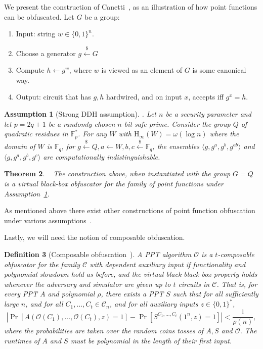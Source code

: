 \documentclass[11pt]{article}
\newcommand{\assref}[1]{\mbox{Assumption~\ref{#1}}}
\newcommand{\zo}{\ensuremath{\{0, 1\}}}
\newcommand{\Hoo}{\mathrm{H}_\infty}
\newtheorem{theorem}{Theorem}[section]
\newtheorem{definition}[theorem]{Definition}
\newtheorem{assumption}[theorem]{Assumption}
\begin{document}
We present the construction of Canetti~\cite{canetti1997towards}, as an illustration of how point functions can be obfuscated.  Let $G$ be a group:
\begin{enumerate}  
\item Input: string $w\in \zo^n$.
\item Choose a generator $g\overset{\$}\leftarrow G$
\item Compute $h\leftarrow g^w$, where $w$ is viewed as an element of $G$ is some canonical way.
\item Output: circuit that has $g, h$ hardwired, and on input $x$, accepts iff $g^x=h$.
\end{enumerate}
\begin{assumption}[Strong DDH assumption]\label{ass:strong ddh}.  Let $n$ be a security parameter and let $p = 2q+1$ be a randomly chosen $n$-bit safe prime.  Consider the group $Q$ of quadratic residues in $\mathbb{F}_p^*$.  For any $W$ with $\Hoo(W)= \omega(\log n)$ where the domain of $W$ is $\mathbb{F}_q$, for $g\overset{\$}\leftarrow Q, a\leftarrow W, b,c \overset{\$}\leftarrow \mathbb{F}_q$, the ensembles $\langle g, g^a, g^b, g^{ab}\rangle$ and $\langle g, g^a, g^b, g^c\rangle$ are computationally indistinguishable.
\end{assumption}
\begin{theorem}~\cite{canetti1997towards}
The construction above, when instantiated with the group $G = Q$ is a virtual black-box obfuscator for the family of point functions under \assref{ass:strong ddh}.
\end{theorem}

As mentioned above there exist other constructions of point function obfuscation under various assumptions~\cite{lynn2004positive, wee2005obfuscating}.

Lastly, we will need the notion of composable obfuscation.

\begin{definition}[Composable obfuscation~\cite{bitansky2010strong, canetti2008obfuscating,lynn2004positive}]
\label{def:obf comp}
A PPT algorithm $\mathcal{O}$ is a $t$-\emph{composable obfuscator} for the family $\mathcal{C}$ with dependent auxiliary input if functionality and polynomial slowdown hold as before, and the virtual black black-box property holds whenever the adversary and simulator are given up to $t$ circuits in $\mathcal{C}$.  That is, for every PPT $A$ and polynomial $\rho$, there exists a PPT $S$ such that for all sufficiently large $n$, and for all $C_1,..., C_t\in \mathcal{C}_n$, and for all auxiliary inputs $z\in \zo^*$, 
\[
|\Pr[A(\mathcal{O}(C_1), ..., \mathcal{O}(C_t), z) = 1] - \Pr[S^{C_1,..., C_t}(1^n, z) = 1]| < \frac{1}{\rho(n)},
\]
where the probabilities are taken over the random coins tosses of $A, S$ and $\mathcal{O}$.  The runtimes of $A$ and $S$ must be polynomial in the length of their first input.
\end{definition}
\end{document}
